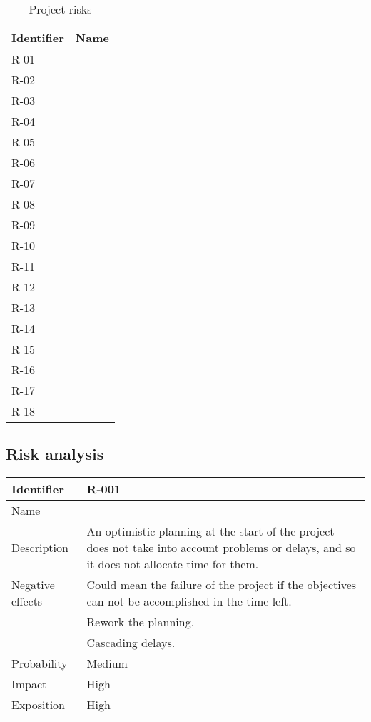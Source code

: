 \begin{table}[H]
	\caption{Project risks}
	\begin{tabularx}{\textwidth}{|l|X|}
		\hline
		\rowcolor{gray!30}
		Identifier & Name \\ \hline
		R-01 & \Runo \\ \hline
		R-02 & \Rdos \\ \hline
		R-03 & \Rtres \\ \hline
		R-04 & \Rcuatro \\ \hline
		R-05 & \Rcinco \\ \hline
		R-06 & \Rseis \\ \hline
		R-07 & \Rsiete \\ \hline
		R-08 & \Rocho \\ \hline
		R-09 & \Rnueve \\ \hline
		R-10 & \Rdiez \\ \hline
		R-11 & \Ronce \\ \hline
		R-12 & \Rdoce \\ \hline
		R-13 & \Rtrece \\ \hline
		R-14 & \Rcatorce \\ \hline
		R-15 & \Rquince \\ \hline
		R-16 & \Rdieciseis \\ \hline
		R-17 & \Rdiecisiete \\ \hline
		R-18 & \Rdieciocho \\ \hline
	\end{tabularx}
\end{table}





\subsection{Risk analysis}


\begin{table}[H]
	\begin{tabularx}{\textwidth}{|l|X|}
		\hline
		\rowcolor{gray!30}
		Identifier & \textbf{R-001} \\ \hline
		Name & \Runo \\ \hline
		Description & An optimistic planning at the start of the project does not take into account problems or delays, and so it does not allocate time for them. \\ \hline
		Negative effects
			& Could mean the failure of the project if the objectives can not be accomplished in the time left. \\
			& Rework the planning. \\
			& Cascading delays.\\ \hline
		Probability & Medium\\ \hline
		Impact &  High\\ \hline
		Exposition &  High\\ \hline
	\end{tabularx}
\end{table}

